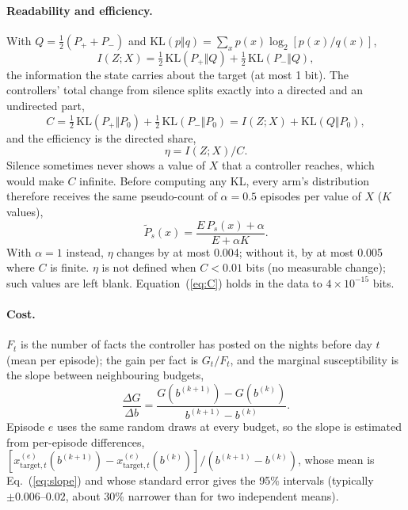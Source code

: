 \documentclass[10pt,a4paper]{article}
\begin{document}
\paragraph{Readability and efficiency.} With $Q = \frac12(P_+ + P_-)$ and $\mathrm{KL}(p\Vert q) = \sum_x p(x)\log_2[p(x)/q(x)]$,
\begin{equation}\label{eq:I}
I(Z;X) = \tfrac12\,\mathrm{KL}(P_+\Vert Q) + \tfrac12\,\mathrm{KL}(P_-\Vert Q),
\end{equation}
the information the state carries about the target (at most 1 bit). The controllers' total change from silence
splits exactly into a directed and an undirected part,
\begin{equation}\label{eq:C}
C = \tfrac12\,\mathrm{KL}(P_+\Vert P_0) + \tfrac12\,\mathrm{KL}(P_-\Vert P_0) = I(Z;X) + \mathrm{KL}(Q\Vert P_0),
\end{equation}
and the efficiency is the directed share,
\begin{equation}\label{eq:eta}
\eta = I(Z;X)/C .
\end{equation}
Silence sometimes never shows a value of $X$ that a controller reaches, which would make $C$ infinite. Before
computing any KL, every arm's distribution therefore receives the same pseudo-count of $\alpha = 0.5$ episodes per
value of $X$ ($K$ values),
\begin{equation}\label{eq:smooth}
\tilde P_s(x) = \frac{E\,P_s(x) + \alpha}{E + \alpha K}.
\end{equation}
With $\alpha = 1$ instead, $\eta$ changes by at most 0.004; without it, by at most 0.005 where $C$ is finite. $\eta$ is not defined when $C < 0.01$ bits (no measurable change);
such values are left blank. Equation~(\ref{eq:C}) holds in the data to $4\times10^{-15}$ bits.

\paragraph{Cost.} $F_t$ is the number of facts the controller has posted on the nights before day $t$ (mean per
episode); the gain per fact is $G_t/F_t$, and the marginal susceptibility is the slope between neighbouring
budgets,
\begin{equation}\label{eq:slope}
\frac{\Delta G}{\Delta b} = \frac{G(b^{(k+1)}) - G(b^{(k)})}{b^{(k+1)} - b^{(k)}} .
\end{equation}
Episode $e$ uses the same random draws at every budget, so the slope is estimated from per-episode differences,
$[x^{(e)}_{\text{target},t}(b^{(k+1)}) - x^{(e)}_{\text{target},t}(b^{(k)})]/(b^{(k+1)} - b^{(k)})$, whose mean is
Eq.~(\ref{eq:slope}) and whose standard error gives the 95\% intervals (typically $\pm0.006$--$0.02$, about 30\%
narrower than for two independent means).
\end{document}
